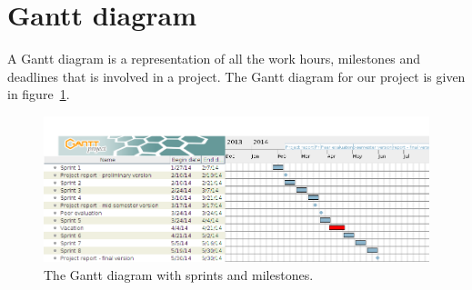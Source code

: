 \section{Gantt diagram}

A Gantt diagram is a representation of all the work hours, milestones and deadlines that is involved in a project. The Gantt diagram for our project is given in figure~\ref{fig:gantt}.


\begin{figure}[H]
\includegraphics[width=\textwidth]{ch/planning/fig/gantt.png}
\caption{The Gantt diagram with sprints and milestones.}
\label{fig:gantt}
\end{figure}